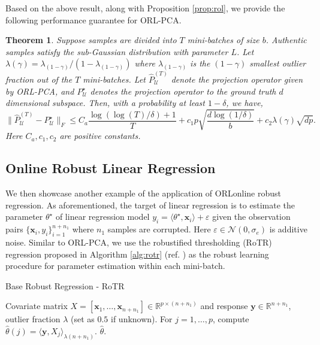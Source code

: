 \documentclass[11pt]{article}
\newtheorem{theorem}{Theorem}
\begin{document}
Based on the above result, along with Proposition \ref{prop:rol}, we provide the following performance guarantee for ORL-PCA.
\begin{theorem}
	\label{theo:rol_pca}
	Suppose samples are divided into $ T $ mini-batches of size $b$. Authentic samples satisfy the sub-Gaussian distribution with parameter $L$. Let $ \lambda(\gamma) = \lambda_{(1-\gamma)}/(1-\lambda_{(1-\gamma)})$ where $\lambda_{(1-\gamma)}$ is the $(1-\gamma)$ smallest outlier fraction out of the $T$ mini-batches.
	Let $ \widehat{P}_\mathcal{U}^{(T)} $ denote the projection operator given by ORL-PCA, and $ P_\mathcal{U}^\star $ denotes the projection operator to the ground truth $ d $ dimensional subspace. Then, with a probability at least $ 1-\delta $,  we have,
	\begin{equation*}
	\|\widehat{P}_\mathcal{U}^{(T)}  -P_\mathcal{U}^\star   \|_F 	 \leq C_a \frac{\log(\log(T)/\delta) + 1}{T} 
 + c_1p\sqrt{\frac{d\log(1/\delta) }{b}} + c_2 \lambda(\gamma)\sqrt{dp}.
	\end{equation*}
	Here $ C_a,c_1,c_2 $ are  positive constants.
\end{theorem}


\subsection{Online Robust Linear Regression}
We then showcase another example of the application of ORL\textemdash online robust regression. As aforementioned, the target of linear regression is to estimate the parameter $ \theta^\star $ of linear regression model $ y_i=\langle \theta^\star, \mathbf{x}_i \rangle + \varepsilon $ given the observation pairs $ \{\mathbf{x}_i,y_i\}_{i=1}^{n+n_1} $ where $ n_1 $ samples are corrupted. Here $ \varepsilon \in \mathcal{N}(0,\sigma_e) $ is additive noise. Similar to ORL-PCA, we use the robustified thresholding (RoTR) regression proposed in Algorithm \ref{alg:rotr} (ref. \cite{chen2013robust}) as the robust learning procedure for parameter estimation within each mini-batch. 
\begin{algorithm}[h]
	\caption{Base Robust Regression - RoTR}
	\label{alg:rotr}
	\begin{algorithmic}
		 Covariate matrix $X = [\mathbf{x}_1,\ldots,\mathbf{x}_{n+n_1}] \in \mathbb{R}^{p\times (n+n_1)}$ and response $\mathbf{y}\in\mathbb{R}^{n+n_1}$, outlier fraction $\lambda$ (set as $ 0.5 $ if unknown).
		\STATE For $j=1,\ldots,p$, compute $\widehat{\theta}(j)=\langle \mathbf{y}, X_j \rangle_{\lambda(n+n_1)}$.
		 $\widehat{\theta}$.
	\end{algorithmic}
\end{algorithm}
\end{document}
